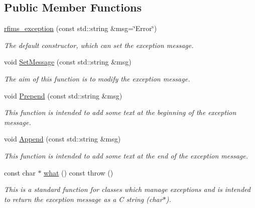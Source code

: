 \subsection*{Public Member Functions}
\begin{DoxyCompactItemize}
\item 
\hyperlink{classrfims__exception_aed3788a57bce5b92083bf52994c588bb}{rfims\+\_\+exception} (const std\+::string \&msg=\char`\"{}Error\char`\"{})
\begin{DoxyCompactList}\small\item\em The default constructor, which can set the exception message. \end{DoxyCompactList}\item 
void \hyperlink{classrfims__exception_a4c1650baf96931af97f24ad532ba0742}{Set\+Message} (const std\+::string \&msg)
\begin{DoxyCompactList}\small\item\em The aim of this function is to modify the exception message. \end{DoxyCompactList}\item 
void \hyperlink{classrfims__exception_a78d047f0755c52e6717f32a159addb75}{Prepend} (const std\+::string \&msg)
\begin{DoxyCompactList}\small\item\em This function is intended to add some text at the beginning of the exception message. \end{DoxyCompactList}\item 
void \hyperlink{classrfims__exception_a5a90261ca9eba0f0b365e4f61fa60df2}{Append} (const std\+::string \&msg)
\begin{DoxyCompactList}\small\item\em This function is intended to add some text at the end of the exception message. \end{DoxyCompactList}\item 
\mbox{\label{classrfims__exception_a6c118ef3179c20e25cff1151a6ed9567}} 
const char $\ast$ \hyperlink{classrfims__exception_a6c118ef3179c20e25cff1151a6ed9567}{what} () const  throw ()
\begin{DoxyCompactList}\small\item\em This is a standard function for classes which manage exceptions and is intended to return the exception message as a C string ({\ttfamily char$\ast$}). \end{DoxyCompactList}\end{DoxyCompactItemize}


